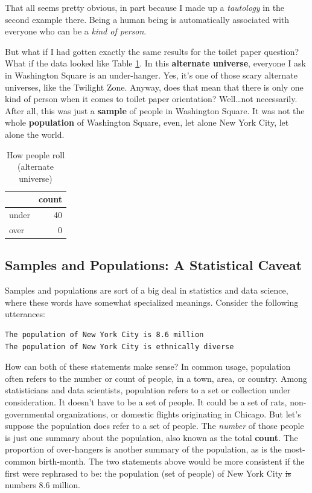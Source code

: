 \documentclass[
  openany]{book}
\begin{document}
That all seems pretty obvious, in part because I made up a \emph{tautology} in the second example there. Being a human being is automatically associated with everyone who can be a \emph{kind of person}.

But what if I had gotten exactly the same results for the toilet paper question? What if the data looked like Table \ref{tab:tp-redux}. In this \textbf{alternate universe}, everyone I ask in Washington Square is an under-hanger. Yes, it's one of those scary alternate universes, like the Twilight Zone. Anyway, does that mean that there is only one kind of person when it comes to toilet paper orientation? Well\ldots not necessarily. After all, this was just a \textbf{sample} of people in Washington Square. It was not the whole \textbf{population} of Washington Square, even, let alone New York City, let alone the world.

\begin{table}[!h]

\caption{\label{tab:tp-redux}How people roll (alternate universe)}
\centering
\begin{tabular}[t]{lr}
\toprule
  & count\\
\midrule
under & 40\\
over & 0\\
\bottomrule
\end{tabular}
\end{table}

\hypertarget{samples-and-populations-a-statistical-caveat}{%
\subsection*{Samples and Populations: A Statistical Caveat}\label{samples-and-populations-a-statistical-caveat}}

Samples and populations are sort of a big deal in statistics and data science, where these words have somewhat specialized meanings. Consider the following utterances:

\begin{verbatim}
The population of New York City is 8.6 million
The population of New York City is ethnically diverse
\end{verbatim}

How can both of these statements make sense? In common usage, population often refers to the number or count of people, in a town, area, or country. Among statisticians and data scientists, population refers to a set or collection under consideration. It doesn't have to be a set of people. It could be a set of rats, non-governmental organizations, or domestic flights originating in Chicago. But let's suppose the population does refer to a set of people. The \emph{number} of those people is just one summary about the population, also known as the total \textbf{count}. The proportion of over-hangers is another summary of the population, as is the most-common birth-month. The two statements above would be more consistent if the first were rephrased to be: the population (set of people) of New York City \sout{is} numbers 8.6 million.
\end{document}
